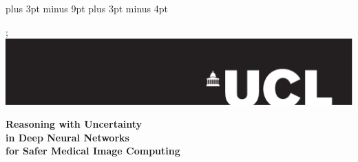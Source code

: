 \documentclass[12pt,a4paper,twoside]{book}
\newcommand{\HRule}{\rule{\linewidth}{0.5mm}}
\newcommand{\FrontPageStyle}{\pagestyle{empty}}
\begin{document}
\belowdisplayskip=12pt plus 3pt minus 9pt
\belowdisplayshortskip=7pt plus 3pt minus 4pt

\FrontPageStyle{}

\begin{titlepage}
\begin{center}

% 
% 

\vspace*{-9em}; 
\hbox{ \hspace*{-18em} \includegraphics[width=1.7\textwidth]{images/univ_logo-eps-converted-to.pdf}}
\null%
\vspace*{7em}%

{\Large 

{ \Huge \textbf{Reasoning with Uncertainty \\ in Deep Neural Networks \\ for Safer Medical Image Computing}\\ [0.4cm]}




}
\end{center}
\end{titlepage}
\end{document}
